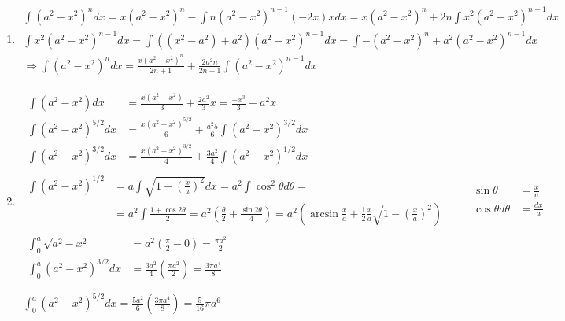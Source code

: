 \documentclass[twoside]{amsart}
\theoremstyle{plain}
\theoremstyle{definition}
\newcommand{\exercisehead}[1]
  {\smallskip
   \noindent{\small\bf Exercise #1.}}
\begin{document}
\exercisehead{15} 
\begin{enumerate}
\item 
\[
\begin{gathered}
  \int (a^2 - x^2 )^n dx  = x(a^2 - x^2)^n - \int n (a^2- x^2)^{n-1} (-2x) x dx = x (a^2 - x^2)^n + 2n \int x^2 ( a^2 - x^2)^{n-1} dx \\
  \int x^2 (a^2 - x^2)^{n-1} dx = \int ( (x^2 - a^2) + a^2)(a^2 - x^2)^{n-1} dx = \int -(a^2-x^2)^n + a^2(a^2- x^2)^{n-1} dx \\
  \Longrightarrow \int (a^2 - x^2)^n dx = \frac{ x(a^2 - x^2)^n }{ 2n+1 } + \frac{ 2a^2 n}{ 2n+1} \int (a^2 - x^2)^{n-1} dx 
\end{gathered}
\]
\item 
\[
\begin{gathered}
  \begin{aligned}
    \int (a^2- x^2) dx & = \frac{ x (a^2- x^2) }{ 3}  + \frac{ 2a^2}{3} x = \frac{ -x^3 }{3} + a^2 x \\
    \int (a^2- x^2)^{5/2} dx & = \frac{ x(a^2 - x^2)^{5/2}}{ 6} + \frac{a^2 5}{6} \int (a^2 - x^2)^{3/2} dx \\
    \int (a^2 - x^2)^{3/2} dx & = \frac{ x (a^2 - x^2)^{3/2} }{ 4 } + \frac{ 3a^2}{4} \int (a^2- x^2 )^{1/2} dx 
\end{aligned} \\
  \begin{aligned}
    \int (a^2 - x^2)^{1/2} & = a \int \sqrt{ 1 - \left( \frac{x}{a} \right)^2 } dx = a^2 \int \cos^2{\theta} d\theta = \\
& = a^2 \int \frac{ 1 + \cos{2\theta}}{ 2 } = a^2 \left( \frac{ \theta}{2} + \frac{ \sin{2\theta}}{4} \right) = a^2 \left( \arcsin{ \frac{x}{a} } + \frac{1}{2} \frac{x}{a} \sqrt{ 1 - \left( \frac{x}{a} \right)^2 } \right) 
\end{aligned} \quad \quad 
  \begin{aligned}
    \sin{\theta} & = \frac{x}{a} \\
    \cos{\theta} d\theta & = \frac{dx}{a} 
\end{aligned} \\
  \begin{aligned}
    \int_0^a \sqrt{ a^2 - x^2 } & = a^2 \left( \frac{ \pi}{2} - 0 \right) = \frac{ \pi a^2}{2} \\
    \int_0^a (a^2 - x^2 )^{3/2} dx & = \frac{3a^2}{4} \left( \frac{ \pi a^2}{2} \right) = \frac{ 3 \pi a^4}{8} \\
 \end{aligned} \\
\boxed{   \int_0^a (a^2 - x^2)^{5/2} dx  = \frac{ 5a^2}{6} \left( \frac{3\pi a^4}{8} \right) = \boxed{ \frac{5}{16} \pi a^6 } }
\end{gathered}
\]
\end{enumerate}
\end{document}
